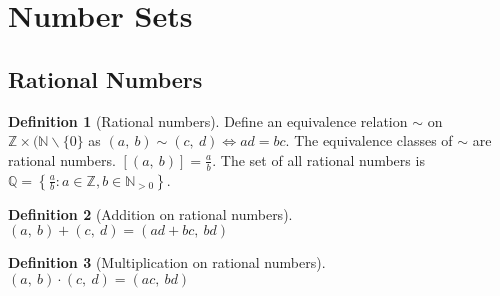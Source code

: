 \documentclass{article}
\newcommand*{\N}{\mathbb{N}}
\newcommand*{\Z}{\mathbb{Z}}
\newcommand*{\Q}{\mathbb{Q}}
\theoremstyle{plain}
\numberwithin{theorem}{subsection}
\theoremstyle{definition}
\newtheorem{definition}{Definition}[section]
\numberwithin{definition}{subsection}
\theoremstyle{remark}
\numberwithin{note}{subsection}
\begin{document}
\section{Number Sets}
\subsection{Rational Numbers}
\begin{definition}[Rational numbers]
    Define an equivalence relation $\sim$ on $\Z \times (\N\backslash\{0\}$
    as $(a,\: b) \sim (c,\: d) \iff ad=bc$.
    The equivalence classes of $\sim$ are rational numbers.
    $[(a,\: b)] = \frac{a}{b}$.
    The set of all rational numbers is
    $\Q = \left\{ \frac{a}{b} : a\in \Z, b\in \N_{>0} \right\}$.
\end{definition}
%
\begin{definition}[Addition on rational numbers]
    $(a,\: b) + (c,\: d) = (ad+bc,\: bd)$
\end{definition}
%
\begin{definition}[Multiplication on rational numbers]
    $(a,\: b) \cdot (c,\: d) = (ac,\: bd)$
\end{definition}
%
\end{document}
